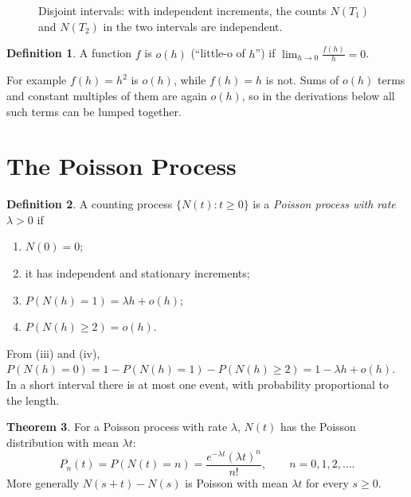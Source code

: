 \documentclass[12pt,a4paper]{report}
\theoremstyle{definition}
\newtheorem{thm}{Theorem}[section]
\newtheorem{defn}[thm]{Definition}
\begin{document}
\begin{figure}[H]
\centering
{}
\caption{Disjoint intervals: with independent increments, the counts $N(T_1)$ and $N(T_2)$ in the two intervals are independent.}
\label{fig:increments}
\end{figure}

\begin{defn}
\label{def:littleo}
A function $f$ is $o(h)$ (``little-o of $h$'') if $\lim_{h\to 0}\frac{f(h)}{h} = 0$.
\end{defn}

For example $f(h) = h^2$ is $o(h)$, while $f(h) = h$ is not. Sums of $o(h)$ terms and constant
multiples of them are again $o(h)$, so in the derivations below all such terms can be lumped
together.

\section{The Poisson Process}

\begin{defn}
\label{def:poissonprocess}
A counting process $\{N(t) : t\geq 0\}$ is a \emph{Poisson process with rate} $\lambda>0$ if
\begin{enumerate}
\item[(i)] $N(0) = 0$;
\item[(ii)] it has independent and stationary increments;
\item[(iii)] $P(N(h) = 1) = \lambda h + o(h)$;
\item[(iv)] $P(N(h)\geq 2) = o(h)$.
\end{enumerate}
\end{defn}

From (iii) and (iv), $P(N(h) = 0) = 1 - P(N(h) = 1) - P(N(h)\geq 2) = 1 - \lambda h + o(h)$. In a short
interval there is at most one event, with probability proportional to the length.

\begin{thm}
\label{thm:poissondist}
For a Poisson process with rate $\lambda$, $N(t)$ has the Poisson distribution with mean $\lambda t$:
\[P_n(t) = P(N(t) = n) = \frac{e^{-\lambda t}(\lambda t)^n}{n!},\qquad n = 0, 1, 2, \dots .\]
More generally $N(s + t) - N(s)$ is Poisson with mean $\lambda t$ for every $s\geq 0$.
\end{thm}
\end{document}
